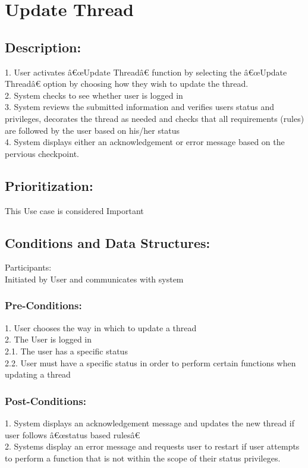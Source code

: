 \documentclass[a4paper,11pt]{article}
\begin{document}
\section{Update Thread}
\subsection*{Description:}
1.	User activates â€œUpdate Threadâ€ function by selecting the â€œUpdate Threadâ€ option by choosing how they wish to update the thread.\\
2.	System checks to see whether user is logged in\\
3.	System reviews the submitted information and  verifies users status and privileges, decorates the thread as needed and checks that all requirements (rules) are followed by the user based on his/her status\\
4.	 System displays either an acknowledgement or error message based on the pervious checkpoint.\\

\subsection{Prioritization:} 
This Use case is considered Important\\
\subsection{Conditions and Data Structures:}
Participants:\\
Initiated by User and communicates with system\\
\subsubsection*{Pre-Conditions:}
1.	User chooses the way in which to update a thread\\
2.	The User is logged in \\
2.1.	The user has a specific status\\
2.2.	User must have a specific status in order to perform certain functions when updating a thread\\
\subsubsection*{Post-Conditions:}
1.	System displays an acknowledgement message and updates  the new thread  if user follows â€œstatus based rulesâ€\\
2.	Systems display an error message and requests user to restart if user attempts to perform a function that is not within the scope of their status privileges.\\
\end{document}
